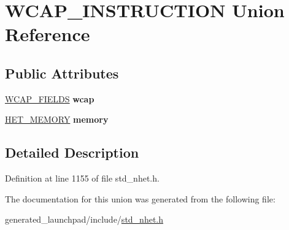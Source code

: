 \hypertarget{unionWCAP__INSTRUCTION}{}\section{W\+C\+A\+P\+\_\+\+I\+N\+S\+T\+R\+U\+C\+T\+I\+ON Union Reference}
\label{unionWCAP__INSTRUCTION}
\subsection*{Public Attributes}
\begin{DoxyCompactItemize}
\item 
\mbox{\label{unionWCAP__INSTRUCTION_ae365c1e5aaa2c0a3e38db88a323b6984}} 
\mbox{\hyperlink{structwcap__format}{W\+C\+A\+P\+\_\+\+F\+I\+E\+L\+DS}} {\bfseries wcap}
\item 
\mbox{\label{unionWCAP__INSTRUCTION_ad7bd6481887bfff1600c52d7d5162dbf}} 
\mbox{\hyperlink{structmemory__format}{H\+E\+T\+\_\+\+M\+E\+M\+O\+RY}} {\bfseries memory}
\end{DoxyCompactItemize}


\subsection{Detailed Description}


Definition at line 1155 of file std\+\_\+nhet.\+h.



The documentation for this union was generated from the following file\+:\begin{DoxyCompactItemize}
\item 
generated\+\_\+launchpad/include/\mbox{\hyperlink{std__nhet_8h}{std\+\_\+nhet.\+h}}\end{DoxyCompactItemize}
